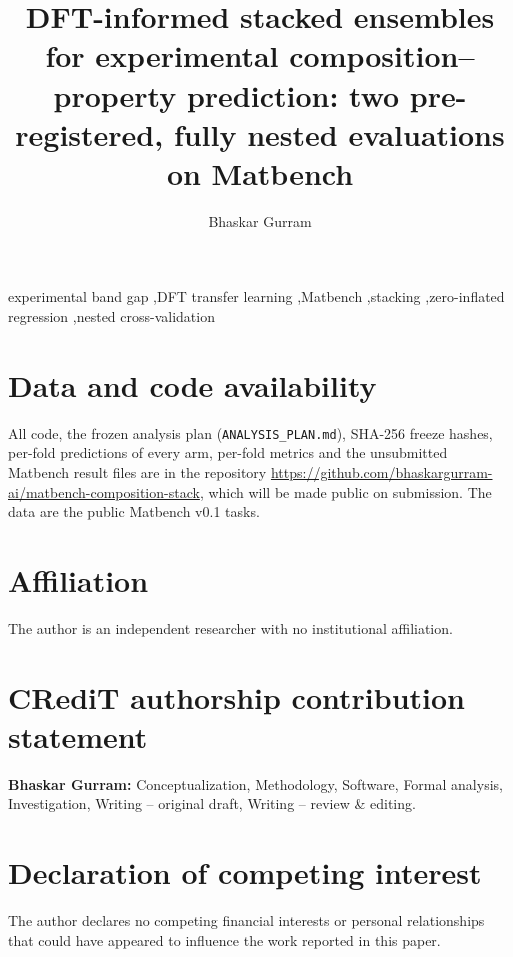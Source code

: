 \documentclass[preprint,12pt,authoryear]{elsarticle}
\begin{document}
\begin{frontmatter}

\title{DFT-informed stacked ensembles for experimental composition--property prediction: two pre-registered, fully nested evaluations on Matbench}

\author{Bhaskar Gurram}



\begin{keyword}
experimental band gap \sep DFT transfer learning \sep Matbench \sep stacking \sep zero-inflated regression \sep nested cross-validation
\end{keyword}

\end{frontmatter}

\linenumbers






\section*{Data and code availability}
All code, the frozen analysis plan (\texttt{ANALYSIS\_PLAN.md}), SHA-256 freeze hashes, per-fold predictions of every arm, per-fold metrics and the unsubmitted Matbench result files are in the repository \url{https://github.com/bhaskargurram-ai/matbench-composition-stack}, which will be made public on submission. The data are the public Matbench v0.1 tasks.

\section*{Affiliation}
The author is an independent researcher with no institutional affiliation.

\section*{CRediT authorship contribution statement}
\textbf{Bhaskar Gurram:} Conceptualization, Methodology, Software, Formal analysis, Investigation, Writing -- original draft, Writing -- review \& editing.

\section*{Declaration of competing interest}
The author declares no competing financial interests or personal relationships that could have appeared to influence the work reported in this paper.
\end{document}
